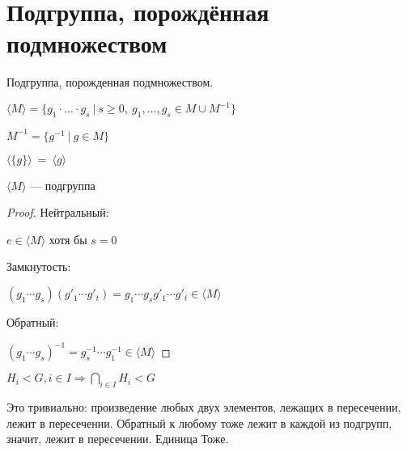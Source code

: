 \section{Подгруппа, порождённая подмножеством}
\begin{conj}
    Подгруппа, порожденная подмножеством.
  
    $\langle M \rangle = \{ g_1 \cdot \ldots \cdot g_s\ |\ s \geq 0,\ g_1, \ldots, g_s \in M \cup M^{-1} \}$
  
    $M^{-1} = \{ g^{-1}\ |\ g\in M \}$
    
\end{conj}
  
\notice $\langle \{g\} \rangle \ =\ \langle g \rangle$
\begin{theorem-non}
$\langle M \rangle$ --- подгруппа
\begin{proof} \quad 

    Нейтральный:

    $e\in \langle M \rangle$ хотя бы $s = 0$

    Замкнутость: 

    $(g_1 \cdots g_s)(g'_1 \cdots g'_t) = g_1 \cdots g_s g'_1 \cdots g'_t \in \langle M \rangle$

    Обратный:
    
    $(g_1 \cdots g_s)^{-1} = g_s^{-1} \cdots g_1^{-1} \in \langle M \rangle$  
\end{proof}

\end{theorem-non}
\notice $H_i < G, i\in I \Longrightarrow \bigcap\limits_{i\in I} H_i < G$

Это тривиально: произведение любых двух элементов, лежащих в пересечении, лежит в пересечении. Обратный к любому тоже лежит в каждой из подгрупп, значит, лежит в пересечении. Единица Тоже.

